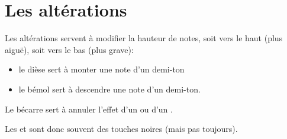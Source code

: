 \section{Les altérations}
Les altérations servent à modifier la hauteur de notes, soit vers le haut (plus aiguë), soit vers le bas (plus grave):
\begin{itemize}
\item le dièse \sharp {}\index{\sharp} sert à monter une note d'un demi-ton
\item le bémol \flat {}\index{\flat} sert à descendre une note d'un demi-ton.
\end{itemize}
Le bécarre \natural{}\index{\natural} sert à annuler l'effet d'un \sharp{} ou d'un \flat. 

Les \sharp{} et \flat{} sont donc souvent des touches noires (mais pas toujours).